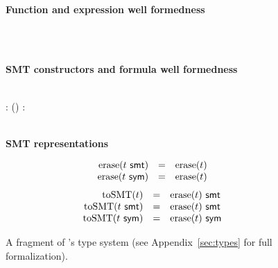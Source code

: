 \documentclass[acmsmall,screen,nonacm]{acmart}
\newcommand{\hdr}[2]{%
\flushleft
\textbf{#1} \hfill {#2} \\
\centering
}
\theoremstyle{definition}
\begin{document}
\begin{figure}[t]
  ~ \\[0.25em]

  \hdr{Function and expression well
    formedness}{ \quad \fbox{$\implicit{\Delta; \Phi} \vdash
    F$} \quad \fbox{$\implicit{\Delta; \Phi; {}} \Gamma \vdash e
    : \tau$} }

  ~ \\[0.25em]


  ~ \\[0.25em]

  \hdr{SMT constructors and formula well formedness}{
    \fbox{$\implicit{\Delta; \Phi; {}} \Gamma \vdash \cSMT{...} : \vec{\tau_i} \rightarrow \tau$}
    \quad
    \fbox{$\implicit{\Delta; \Phi; {}} \Gamma \vdash \phi : \tau$}
  }

  ~ \\[0.25em]

  {
    {\Gamma \vdash {} : \tosmt(\tau)}
  }
  {
    {\Gamma \vdash \phi : }
  }

  ~ \\[0.25em]

  \hdr{SMT representations}{
    \quad {}
    \quad \fbox{$\tosmt(\tau) = \tau$}}

  \threesidebyside[.3][.27][.35][t]
  {\[\begin{array}{rcl}
      \erase(B) &=& B \\
      \erase(D ~ \vec{\tau_i}) &=& D ~ \overrightarrow{\erase(\tau_i)} \\
    \end{array}\]}
  {\[\begin{array}{rcl}
      \mathrm{erase}({t} ~ \mathsf{smt}) &=& \mathrm{erase}(t) \\
      \mathrm{erase}({t} ~ \mathsf{sym}) &=& \mathrm{erase}(t) \\
    \end{array}\]}
  {\[\begin{array}{rcl}
      \mathrm{toSMT}(t) &=& {\mathrm{erase}(t)} ~ \mathsf{smt} \\
      \mathrm{toSMT}({t} ~ \mathsf{smt}) &=& {\mathrm{erase}(t)} ~ \mathsf{smt} \\
      \mathrm{toSMT}({t} ~ \mathsf{sym}) &=& {\mathrm{erase}(t)} ~ \mathsf{sym} \\
    \end{array}\]}

  \caption{A fragment of \Name's type system\iffull{} (see Appendix~\ref{sec:types} for full formalization)\fi.}
  \label{fig:typesystem}
\end{figure}
\end{document}
